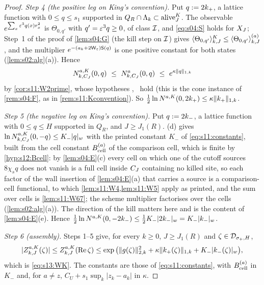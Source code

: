 \begin{proof}
\emph{Step 4 (the positive leg on King's convention).} Put $q:=2k_+$, a lattice function with $0\le q\le s_1$ supported in $Q_R\cap\Lambda_k\subset\operatorname{alive}^K_J$. The observable $e^{\sum_x\varepsilon^3q(x)r_x^2}$ is $\Theta_{0,q'}$ with $q'=\varepsilon^3q\ge0$, of class $\mathcal I$, and \eqref{eq:s04:S} holds for $X_J$; Step~1 of the proof of \cref{lem:s04:G} (the kill step on $\mathcal I$) gives $\langle \Theta_{0,q'}\rangle^{K}_{k,J}\le\langle \Theta_{0,q'}\rangle^{(a)}_{k,J}$, and the multiplier $e^{-(a_k+2\mathsf W_{\varepsilon})\mathsf S(q)}$ is one positive constant for both states (\cref{lem:s02:alg}(a)). Hence
\[
N^{a,K}_{k,\CJ}(0,q)\ \le\ N^a_{k,\CJ}(0,q)\ \le\ e^{\kappa\norm q_{1,k}}
\]
by \cref{cor:s11:W2prime}, whose hypotheses \Itwo, \Ithree\ hold (this is the cone instance of \cref{rem:s04:F}, as in \cref{rem:s11:Kconvention}). So $\frac12\ln N^{a,K}(0,2k_+)\le\kappa\lVert k_+\rVert_{1,k}$.

\emph{Step 5 (the negative leg on King's convention).} Put $q:=2k_-$, a lattice function with $0\le q\le H$ supported in $Q_R$, and $J\ge J_1(R)$. (d) gives $\ln N^{a,K}_{k,C_J}(0,-q)\le K_-\lvert q\rvert_{w}$ with the printed constant $K_-$ of \eqref{eq:s11:constants}, built from the cell constant $B^{(a)}_{\rm cell}$ of the comparison cell, which is finite by \cref{hyp:s12:Bcell}: by \cref{lem:s04:E}(c) every cell on which one of the cutoff sources $8\chi_sq$ does not vanish is a full cell inside $C_J$ containing no killed site, so each factor of the wall insertion of \cref{lem:s04:E}(a) that carries a source is a comparison-cell functional, to which \cref{lem:s11:W4,lem:s11:W5} apply as printed, and the sum over cells is \cref{lem:s11:W67}; the scheme multiplier factorises over the cells (\cref{lem:s02:alg}(a)). The direction of the kill matters here and is the content of \cref{lem:s04:E}(e). Hence $\frac12\ln N^{a,K}(0,-2k_-)\le\frac12K_-\lvert 2k_-\rvert_{w}=K_-\lvert k_-\rvert_{w}$.

\emph{Step 6 (assembly).} Steps 1--5 give, for every $k\ge0$, $J\ge J_1(R)$ and $\zeta\in\mathcal D_{\sigma_+,H}$,
\[
|Z^{a,K}_{k,J}(\zeta)|\le Z^{a,K}_{k,J}(\operatorname{Re}\zeta)\le\exp\big(\lVert g(\zeta)\rVert_{2,k}^2+\kappa\lVert k_+(\zeta)\rVert_{1,k}+K_-\lvert k_-(\zeta)\rvert_{w}\big),
\]
which is \eqref{eq:s13:WK}. The constants are those of \eqref{eq:s11:constants}, with $B^{(a)}_{\rm cell}$ in $K_-$ and, for $a\ne z$, $C_U+s_1\sup_k|z_k-a_k|$ in $\kappa$.


\end{proof}
